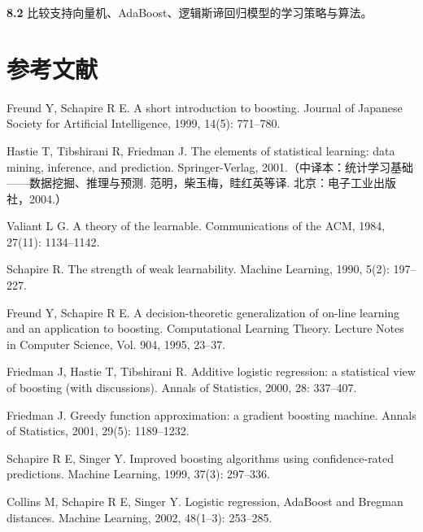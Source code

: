 \documentclass[UTF8,12pt,a4paper,fontset=fandol]{ctexart}
\begin{document}
\noindent\textbf{8.2}\quad
比较支持向量机、AdaBoost、逻辑斯谛回归模型的学习策略与算法。

\section*{参考文献}

\begin{enumerate}[label={[\arabic*]},leftmargin=2.8em]
\item Freund Y, Schapire R E. A short introduction to boosting. Journal of Japanese Society for Artificial Intelligence, 1999, 14(5): 771--780.
\item Hastie T, Tibshirani R, Friedman J. The elements of statistical learning: data mining, inference, and prediction. Springer-Verlag, 2001.（中译本：统计学习基础——数据挖掘、推理与预测. 范明，柴玉梅，眭红英等译. 北京：电子工业出版社，2004.）
\item Valiant L G. A theory of the learnable. Communications of the ACM, 1984, 27(11): 1134--1142.
\item Schapire R. The strength of weak learnability. Machine Learning, 1990, 5(2): 197--227.
\item Freund Y, Schapire R E. A decision-theoretic generalization of on-line learning and an application to boosting. Computational Learning Theory. Lecture Notes in Computer Science, Vol. 904, 1995, 23--37.
\item Friedman J, Hastie T, Tibshirani R. Additive logistic regression: a statistical view of boosting (with discussions). Annals of Statistics, 2000, 28: 337--407.
\item Friedman J. Greedy function approximation: a gradient boosting machine. Annals of Statistics, 2001, 29(5): 1189--1232.
\item Schapire R E, Singer Y. Improved boosting algorithms using confidence-rated predictions. Machine Learning, 1999, 37(3): 297--336.
\item Collins M, Schapire R E, Singer Y. Logistic regression, AdaBoost and Bregman distances. Machine Learning, 2002, 48(1--3): 253--285.
\end{enumerate}
\end{document}
